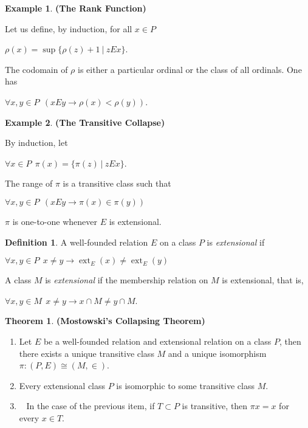 \documentclass[8pt]{article}
\theoremstyle{definition}
\newtheorem{definition}{Definition}[section]
\theoremstyle{definition}
\newtheorem{theorem}{Theorem}[section]
\theoremstyle{definition}
\theoremstyle{definition}
\theoremstyle{definition}
\theoremstyle{definition}
\theoremstyle{definition}
\theoremstyle{definition}
\theoremstyle{definition}
\theoremstyle{definition}
\theoremstyle{definition}
\theoremstyle{definition}
\newtheorem{example}{Example}[section]
\theoremstyle{definition}
\theoremstyle{definition}
\theoremstyle{question}
\begin{document}
\begin{example} {\bf (The Rank Function) }

  Let us define, by induction, for all $x \in P$
  \begin{center}
    $\rho(x) = \sup \{ \rho(z) + 1 \: | \: z E x \}$.
  \end{center}
  The codomain of $\rho$ is either a particular ordinal or the class of all ordinals. One has
  \begin{center}
    $\forall x, y \in P \:\: (x E y \to \rho(x) < \rho(y))$.
  \end{center}
\end{example}

\begin{example} {\bf (The Transitive Collapse)}

  By induction, let
  \begin{center}
    $\forall x \in P \:\: \pi(x) = \{ \pi(z) \: | \: z E x \}$.
  \end{center}

  The range of $\pi$ is a transitive class such that
  \begin{center}
    $\forall x, y \in P \:\: (x E y \to \pi(x) \in \pi(y))$
  \end{center}
\end{example}

$\pi$ is one-to-one whenever $E$ is extensional.

\begin{definition}
  A well-founded relation $E$ on a class $P$ is \emph{extensional} if
  \begin{center}
    $\forall x, y \in P \:\: x \neq y \to \operatorname{ext}_E(x) \neq \operatorname{ext}_E(y)$
  \end{center}
\end{definition}
A class $M$ is \emph{extensional} if the membership relation on $M$ is extensional, that is,
\begin{center}
  $\forall x, y \in M \:\: x \neq y \to x \cap M \neq y \cap M$.
\end{center}

\begin{theorem} {\bf (Mostowski's Collapsing Theorem)}

  \begin{enumerate}
    \item Let $E$ be a well-founded relation and extensional relation on a class $P$, then
    there exists a unique transitive class $M$ and a unique isomorphism $\pi : (P, E) \cong (M, \in)$.
    \item Every extensional class $P$ is isomorphic to some transitive class $M$.
    \item~\label{most:iii} In the case of the previous item, if $T \subset P$ is transitive, 
    then $\pi x = x$ for every $x \in T$.
  \end{enumerate}
\end{theorem}
\end{document}
